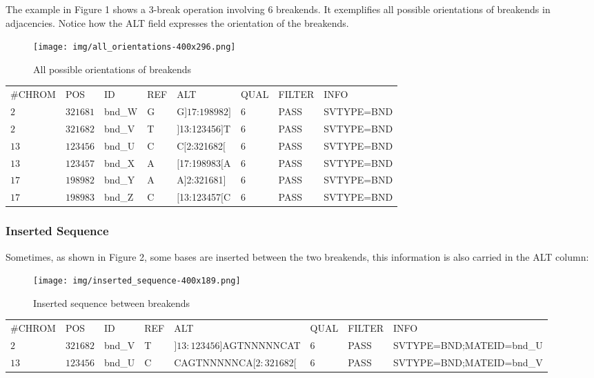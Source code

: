 \documentclass[8pt]{article}
\begin{document}
The example in Figure 1 shows a 3-break operation involving 6 breakends.
It exemplifies all possible orientations of breakends in adjacencies.
Notice how the ALT field expresses the orientation of the breakends.

\begin{figure}[ht]
\centering
\texttt{[image: img/all\_orientations-400x296.png]}
\caption{All possible orientations of breakends}
\end{figure}

\vspace{0.3cm}
\begin{tabular}{ l l l l l l l l }
\#CHROM &POS & ID & REF & ALT & QUAL & FILTER & INFO \\
$2$ & $321681$ & bnd\_W & G & G$]17$:$198982]$ & $6$ & PASS & SVTYPE=BND \\
$2$ & $321682$ & bnd\_V & T & $]$13:123456$]$T & 6 & PASS & SVTYPE=BND \\
$13$ & $123456$ & bnd\_U & C & C$[$2:321682$[$ & 6 & PASS & SVTYPE=BND \\
$13$ & $123457$ & bnd\_X & A & $[$17:198983$[$A & 6 & PASS & SVTYPE=BND \\
$17$ & $198982$ & bnd\_Y & A & A$]$2:321681$]$ & 6 & PASS & SVTYPE=BND \\
$17$ & $198983$ & bnd\_Z & C & $[$13:123457$[$C & 6 & PASS & SVTYPE=BND \\
\end{tabular}

\subsubsection{Inserted Sequence}

Sometimes, as shown in Figure 2, some bases are inserted between the two breakends, this information is also carried in the ALT column:

\begin{figure}[h]
\centering
\texttt{[image: img/inserted\_sequence-400x189.png]}
\caption{Inserted sequence between breakends}
\end{figure}

\vspace{0.3cm}
\footnotesize
\begin{tabular}{ l l l l l l l l }
\#CHROM & POS & ID & REF & ALT & QUAL & FILTER & INFO \\
$2$ & $321682$ & bnd\_V & T & $]13:123456]$AGTNNNNNCAT & $6$ & PASS & SVTYPE=BND;MATEID=bnd\_U \\
$13$ & $123456$ & bnd\_U & C & CAGTNNNNNCA$[2:321682[$ & $6$ & PASS & SVTYPE=BND;MATEID=bnd\_V \\
\end{tabular}
\normalsize
\vspace{0.3cm}
\end{document}
